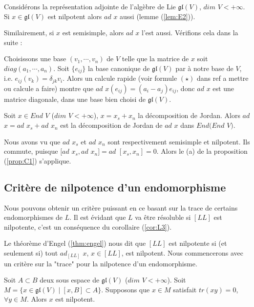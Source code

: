 \documentclass[a4paper,openany,12pt]{report}
\newcommand{\gl}{\mathfrak{gl}}
\theoremstyle{break}
{\theorembodyfont{\upshape}
\newtheorem*{rmq}{Remarque :}
\newtheorem*{prv}{Preuve :}
\newtheorem*{ex}{Exemples :}
\newtheorem*{exe}{Exemple : }
\newtheorem*{nota}{Notation :}
\newtheorem*{dem}{D\'emonstration :}}
\begin{document}
\begin{ex}
Considérons la représentation adjointe de l'algèbre de Lie $\gl(V)$, $dim$ $V < +\infty$. Si $x \in \gl(V)$ est nilpotent alors $ad$ $x$ aussi (lemme (\ref{lem:E2})).

Similairement, si $x$ est semisimple, alors $ad$ $x$ l'est aussi. Vérifions cela dans la suite : 

Choisissons une base $(v_{1},\cdots,v_{n})$ de $V$ telle que la matrice de $x$ soit $diag(a_{1},\cdots,a_{n})$. Soit $\{ e_{ij} \}$ la base canonique de $\gl(V)$ par à notre base de $V$, i.e. $e_{ij}(v_{k})=\delta_{jk}v_{i}$. Alors un calcule rapide (voir formule $(\star)$ dans ref a mettre ou calcule a faire) montre que $ad$ $x(e_{ij})=(a_{i}-a_{j})e_{ij}$, donc $ad$ $x$ est une matrice diagonale, dans une base bien choisi de $\gl(V)$. 
\end{ex}

\begin{lem}\label{lem:C1}
\quad Soit $x \in End$ $V$ ($dim$ $V < +\infty$), $x=x_{s}+x_{n}$ la décomposition de Jordan. Alors $ad$ $x = ad$ $x_{s}+ad$ $x_{n}$ est la décomposition de Jordan de $ad$ $x$ dans $End(End$ $V)$.
\end{lem}

\begin{prv}
\quad Nous avons vu que $ad$ $x_{s}$ et $ad$ $x_{n}$ sont respectivement semisimple et nilpotent. Ils commute, puisque $[ad$ $x_{s},ad$ $x_{n}] = ad$ $[x_{s},x_{n}]=0$. Alors le (a) de la proposition (\ref{prop:C1}) s'applique.
\end{prv}

\subsection{Critère de nilpotence d'un endomorphisme}\label{a}

\quad Nous pouvons obtenir un critère puissant en ce basant sur la trace de certains endomorphismes de $L$. Il est évidant que $L$ va être résoluble si $[LL]$ est nilpotente, c'est un conséquence du corollaire (\ref{cor:L3}).
 
\quad Le théorème d'Engel (\ref{thm:engel}) nous dit que $[LL]$ est nilpotente si (et seulement si) tout $ad_{[LL]}$ $x$, $x \in [LL]$, est nilpotent. Nous commencerons avec un critère sur la "trace" pour la nilpotence d'un endomorphisme.

\begin{lem}\label{lem:C2}
\quad Soit $A \subset B$ deux sous espace de $\gl(V)$ ($dim$ $V<+\infty$). Soit $M= \{ x \in \gl(V) \mid [x,B] \subset A \}$. Supposons que $x \in M$ satisfait $tr(xy)=0$, $\forall y \in M$.
Alors $x$ est nilpotent. 
\end{lem}
\end{document}

